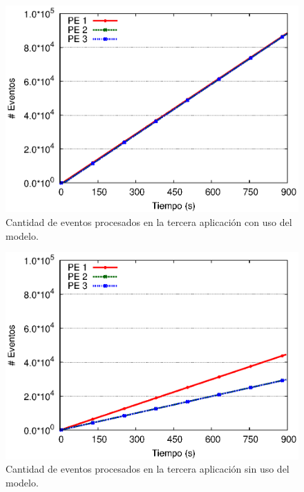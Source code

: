 \newpage

\begin{figure}[!ht]
\centering
    \includegraphics[scale=0.75]{images/exp/app3/cm/logical/eventCount.eps}
    \caption{Cantidad de eventos procesados en la tercera aplicaci\'on con uso del modelo.}
    \label{fig:app3-eventCount-cm}
\end{figure}

\begin{figure}[!ht]
\centering
    \includegraphics[scale=0.75]{images/exp/app3/sm/logical/eventCount.eps}
    \caption{Cantidad de eventos procesados en la tercera aplicaci\'on sin uso del modelo.}
    \label{fig:app3-eventCount-sm}
\end{figure}



